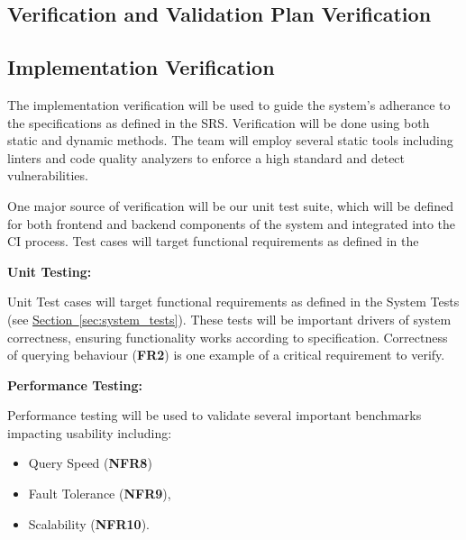\documentclass[12pt, titlepage]{article}
\begin{document}



\subsection{Verification and Validation Plan Verification}




\subsection{Implementation Verification}


The implementation verification will be used to guide the system's adherance to the specifications as defined in the SRS. Verification will be done using both static and dynamic methods. The team will employ several static tools including linters and code quality analyzers to enforce a high standard and detect vulnerabilities. 





One major source of verification will be our unit test suite, which will be defined for both frontend and backend components of the system and integrated into the CI process. Test cases will target functional requirements as defined in the 


\textbf{Unit Testing:}

Unit Test cases will target functional requirements as defined in the System Tests (see \hyperref[sec:system_tests]{Section~\ref{sec:system_tests}}). These tests will be important drivers of system correctness, ensuring functionality works according to specification. Correctness of querying behaviour (\textbf{FR2}) is one example of a critical requirement to verify. 




\textbf{Performance Testing:}

Performance testing will be used to validate several important benchmarks impacting usability including:
\begin{itemize}
  \item Query Speed (\textbf{NFR8})
  \item  Fault Tolerance (\textbf{NFR9}),
  \item Scalability (\textbf{NFR10}). 
\end{itemize}
\end{document}
